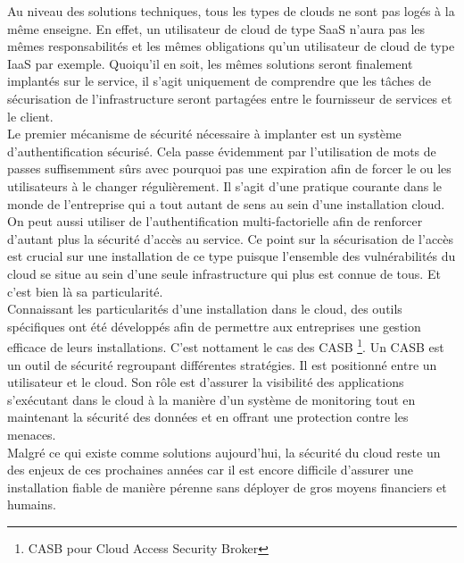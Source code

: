 \documentclass[a4paper, 12pt]{article}
\begin{document}
      Au niveau des solutions techniques, tous les types de clouds ne sont pas
      logés à la même enseigne. En effet, un utilisateur de cloud de type SaaS
      n'aura pas les mêmes responsabilités et les mêmes obligations qu'un
      utilisateur de cloud de type IaaS par exemple. Quoiqu'il en soit, les
      mêmes solutions seront finalement implantés sur le service, il s'agit
      uniquement de comprendre que les tâches de sécurisation de 
      l'infrastructure seront partagées entre le fournisseur de services et 
      le client. \\

      Le premier mécanisme de sécurité nécessaire à implanter est un système 
      d'authentification sécurisé. Cela passe évidemment par l'utilisation 
      de mots de passes suffisemment sûrs avec pourquoi pas une expiration
      afin de forcer le ou les utilisateurs à le changer régulièrement. Il 
      s'agit d'une pratique courante dans le monde de l'entreprise qui a tout
      autant de sens au sein d'une installation cloud. On peut aussi utiliser 
      de l'authentification multi-factorielle afin de renforcer d'autant plus 
      la sécurité d'accès au service. Ce point sur la sécurisation de l'accès 
      est crucial sur une installation de ce type puisque l'ensemble des 
      vulnérabilités du cloud se situe au sein d'une seule infrastructure
      qui plus est connue de tous. Et c'est bien là sa particularité. \\

      Connaissant les particularités d'une installation dans le cloud, des 
      outils spécifiques ont été développés afin de permettre aux entreprises 
      une gestion efficace de leurs installations. C'est nottament le cas des 
      CASB \footnote{CASB pour Cloud Access Security Broker}. Un CASB est un 
      outil de sécurité regroupant différentes stratégies. Il est positionné 
      entre un utilisateur et le cloud. Son rôle est d'assurer la visibilité 
      des applications s'exécutant dans le cloud à la manière d'un système de
      monitoring tout en maintenant la sécurité des données et en offrant une
      protection contre les menaces. \\

      Malgré ce qui existe comme solutions aujourd'hui, la sécurité du cloud 
      reste un des enjeux de ces prochaines années car il est encore difficile
      d'assurer une installation fiable de manière pérenne sans déployer de 
      gros moyens financiers et humains.
\end{document}
